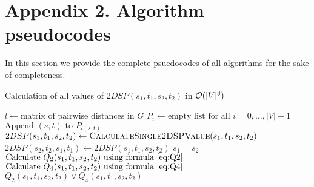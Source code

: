 \section{Appendix 2. Algorithm pseudocodes}

In this section we provide the complete psuedocodes of all algorithms for the sake of completeness.

\begin{algorithm}
\caption{Calculation of all values of $2DSP(s_1, t_1, s_2, t_2)$ in $\mathcal{O}(|V|^8)$} \label{alg:n8}
\begin{algorithmic}[1]
\State $l \gets \text{matrix of pairwise distances in }G$ \label{line:floyd}
\State $P_i \gets \text{empty list for all }i = 0, \ldots, |V|-1$
    \State $\text{Append }(s, t)\text{ to }P_{l(s, t)}$
\EndFor
{}
                \State $2DSP(s_1, t_1, s_2, t_2) \gets \textsc{CalculateSingle2DSPValue}(s_1, t_1, s_2, t_2)$
                \State $2DSP(s_2, t_2, s_1, t_1) \gets 2DSP(s_1, t_1, s_2, t_2)$ 
            \EndFor
        \EndFor
    \EndFor
\EndFor
\EndProcedure
\Statex
{}
    \State \Return $s_1 = s_2$ \label{line:a}
    \State {} \label{line:b} 
\Else
    \State $\text{Calculate }Q_2(s_1, t_1, s_2, t_2)\text{ using formula \eqref{eq:Q2}}$ \label{line:cQ2}
    \State $\text{Calculate }Q_4(s_1, t_1, s_2, t_2)\text{ using formula \eqref{eq:Q4}}$ \label{line:cQ4}
    \State \Return $Q_2(s_1, t_1, s_2, t_2) \vee Q_4(s_1, t_1, s_2, t_2)$
\EndIf
\EndProcedure
\end{algorithmic}
\end{algorithm}


